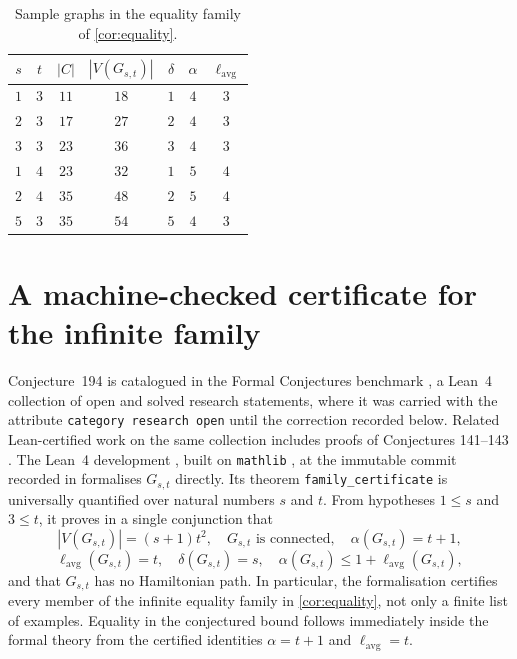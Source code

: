 \documentclass[11pt]{article}
\newcommand{\lavg}{\ell_{\mathrm{avg}}}
\begin{document}
\begin{table}[ht]
  \centering
  \begin{tabular}{@{}ccccccc@{}}
    \toprule
    $s$ & $t$ & $|C|$ & $|V(G_{s,t})|$ & $\delta$ & $\alpha$ & $\lavg$ \\
    \midrule
    $1$ & $3$ & $11$ & $18$ & $1$ & $4$ & $3$ \\
    $2$ & $3$ & $17$ & $27$ & $2$ & $4$ & $3$ \\
    $3$ & $3$ & $23$ & $36$ & $3$ & $4$ & $3$ \\
    $1$ & $4$ & $23$ & $32$ & $1$ & $5$ & $4$ \\
    $2$ & $4$ & $35$ & $48$ & $2$ & $5$ & $4$ \\
    $5$ & $3$ & $35$ & $54$ & $5$ & $4$ & $3$ \\
    \bottomrule
  \end{tabular}
  \caption{Sample graphs in the equality family of \cref{cor:equality}.}
  \label{tab:first}
\end{table}

\section{A machine-checked certificate for the infinite family}\label{sec:lean}

Conjecture~194 is catalogued in the Formal Conjectures benchmark
\cite{formalconjecturesrepo,formalconjecturespaper}, a Lean~4 collection of open and
solved research statements, where it was carried with the attribute
\texttt{category research open} until the correction recorded below.  Related Lean-certified
work on the same collection includes proofs of Conjectures 141--143 \cite{ferudun2026}.  The Lean~4 development \cite{lean4}, built on
\texttt{mathlib} \cite{mathlib}, at the immutable commit recorded in
\cite{formalconjectures194} formalises $G_{s,t}$ directly.  Its theorem
\texttt{family\_certificate} is universally quantified over natural numbers $s$ and $t$.
From hypotheses $1\leq s$ and $3\leq t$, it proves in a single conjunction that
\[
  |V(G_{s,t})|=(s+1)t^2,\quad G_{s,t}\text{ is connected},\quad
  \alpha(G_{s,t})=t+1,
\]
\[
  \lavg(G_{s,t})=t,\quad \delta(G_{s,t})=s,\quad
  \alpha(G_{s,t})\leq 1+\lavg(G_{s,t}),
\]
and that $G_{s,t}$ has no Hamiltonian path.  In particular, the formalisation certifies
every member of the infinite equality family in \cref{cor:equality}, not only a finite
list of examples.  Equality in the conjectured bound follows immediately inside the
formal theory from the certified identities $\alpha=t+1$ and $\lavg=t$.
\end{document}
